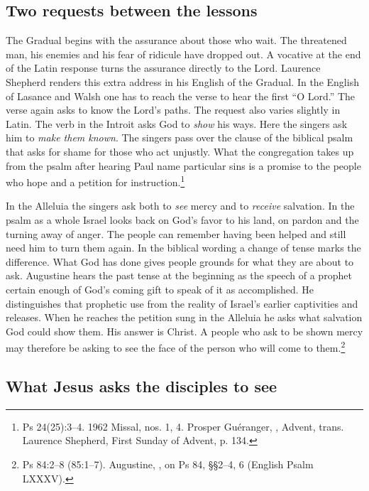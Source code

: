\subsection{Two requests between the lessons}

The Gradual begins with the assurance about those who wait. The threatened man, his enemies and his fear of ridicule have dropped out. A vocative at the end of the Latin response turns the assurance directly to the Lord. Laurence Shepherd renders this extra address in his English of the Gradual. In the English of Lasance and Walsh one has to reach the verse to hear the first ``O Lord.'' The verse again asks to know the Lord's paths. The request also varies slightly in Latin. The verb in the Introit asks God to \emph{show} his ways. Here the singers ask him to \emph{make them known}. The singers pass over the clause of the biblical psalm that asks for shame for those who act unjustly. What the congregation takes up from the psalm after hearing Paul name particular sins is a promise to the people who hope and a petition for instruction.\footnote{Ps 24(25):3--4. 1962 Missal, nos. 1, 4. Prosper Guéranger, , Advent, trans. Laurence Shepherd, First Sunday of Advent, p. 134.}

In the Alleluia the singers ask both to \emph{see} mercy and to \emph{receive} salvation. In the psalm as a whole Israel looks back on God's favor to his land, on pardon and the turning away of anger. The people can remember having been helped and still need him to turn them again. In the biblical wording a change of tense marks the difference. What God has done gives people grounds for what they are about to ask. Augustine hears the past tense at the beginning as the speech of a prophet certain enough of God's coming gift to speak of it as accomplished. He distinguishes that prophetic use from the reality of Israel's earlier captivities and releases. When he reaches the petition sung in the Alleluia he asks what salvation God could show them. His answer is Christ. A people who ask to be shown mercy may therefore be asking to see the face of the person who will come to them.\footnote{Ps 84:2--8 (85:1--7). Augustine, , on Ps 84, §§2--4, 6 (English Psalm LXXXV).}

\subsection{What Jesus asks the disciples to see}

